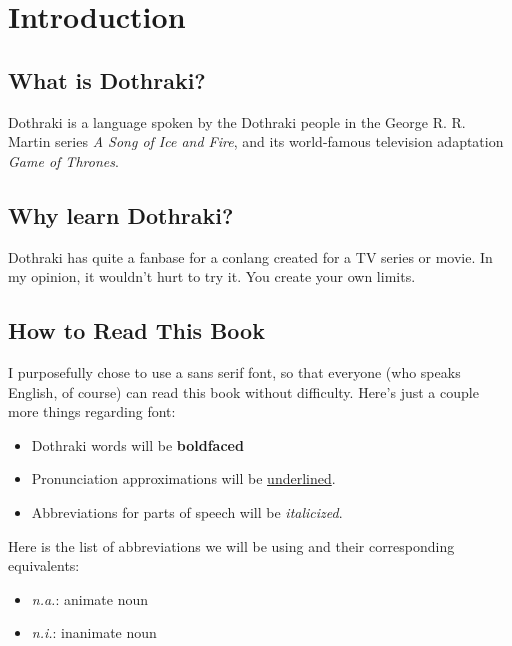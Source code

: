 \chapter*{Introduction}
\section*{What is Dothraki?}
Dothraki is a language spoken by the Dothraki people in the George R. R. Martin
series \textit{A Song of Ice and Fire}, and its world-famous television adaptation
\textit{Game of Thrones}.
\section*{Why learn Dothraki?}
Dothraki has quite a fanbase for a conlang created for a TV series or movie. In my
opinion, it wouldn't hurt to try it. You create your own limits.
\section*{How to Read This Book}
I purposefully chose to use a sans serif font, so that everyone (who speaks English,
of course) can read this book without difficulty. Here's just a couple more things regarding font:
\begin{itemize}
	\item Dothraki words will be \textbf{boldfaced}
	\item Pronunciation approximations will be \underline{underlined}.
	\item Abbreviations for parts of speech will be \textit{italicized}.
\end{itemize}
Here is the list of abbreviations we will be using and their corresponding equivalents:
\begin{itemize}
	\item \textit{n.a.}: animate noun
	\item \textit{n.i.}: inanimate noun
\end{itemize}
